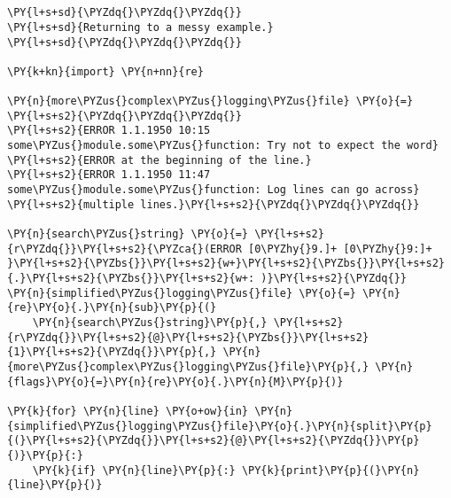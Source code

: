 

\section*{}

\begin{Verbatim}[commandchars=\\\{\}]
\PY{l+s+sd}{\PYZdq{}\PYZdq{}\PYZdq{}}
\PY{l+s+sd}{Returning to a messy example.}
\PY{l+s+sd}{\PYZdq{}\PYZdq{}\PYZdq{}}

\PY{k+kn}{import} \PY{n+nn}{re}

\PY{n}{more\PYZus{}complex\PYZus{}logging\PYZus{}file} \PY{o}{=} \PY{l+s+s2}{\PYZdq{}\PYZdq{}\PYZdq{}}
\PY{l+s+s2}{ERROR 1.1.1950 10:15 some\PYZus{}module.some\PYZus{}function: Try not to expect the word}
\PY{l+s+s2}{ERROR at the beginning of the line.}
\PY{l+s+s2}{ERROR 1.1.1950 11:47 some\PYZus{}module.some\PYZus{}function: Log lines can go across}
\PY{l+s+s2}{multiple lines.}\PY{l+s+s2}{\PYZdq{}\PYZdq{}\PYZdq{}}

\PY{n}{search\PYZus{}string} \PY{o}{=} \PY{l+s+s2}{r\PYZdq{}}\PY{l+s+s2}{\PYZca{}(ERROR [0\PYZhy{}9.]+ [0\PYZhy{}9:]+ }\PY{l+s+s2}{\PYZbs{}}\PY{l+s+s2}{w+}\PY{l+s+s2}{\PYZbs{}}\PY{l+s+s2}{.}\PY{l+s+s2}{\PYZbs{}}\PY{l+s+s2}{w+: )}\PY{l+s+s2}{\PYZdq{}}
\PY{n}{simplified\PYZus{}logging\PYZus{}file} \PY{o}{=} \PY{n}{re}\PY{o}{.}\PY{n}{sub}\PY{p}{(}
    \PY{n}{search\PYZus{}string}\PY{p}{,} \PY{l+s+s2}{r\PYZdq{}}\PY{l+s+s2}{@}\PY{l+s+s2}{\PYZbs{}}\PY{l+s+s2}{1}\PY{l+s+s2}{\PYZdq{}}\PY{p}{,} \PY{n}{more\PYZus{}complex\PYZus{}logging\PYZus{}file}\PY{p}{,} \PY{n}{flags}\PY{o}{=}\PY{n}{re}\PY{o}{.}\PY{n}{M}\PY{p}{)}

\PY{k}{for} \PY{n}{line} \PY{o+ow}{in} \PY{n}{simplified\PYZus{}logging\PYZus{}file}\PY{o}{.}\PY{n}{split}\PY{p}{(}\PY{l+s+s2}{\PYZdq{}}\PY{l+s+s2}{@}\PY{l+s+s2}{\PYZdq{}}\PY{p}{)}\PY{p}{:}
    \PY{k}{if} \PY{n}{line}\PY{p}{:} \PY{k}{print}\PY{p}{(}\PY{n}{line}\PY{p}{)}
\end{Verbatim}
